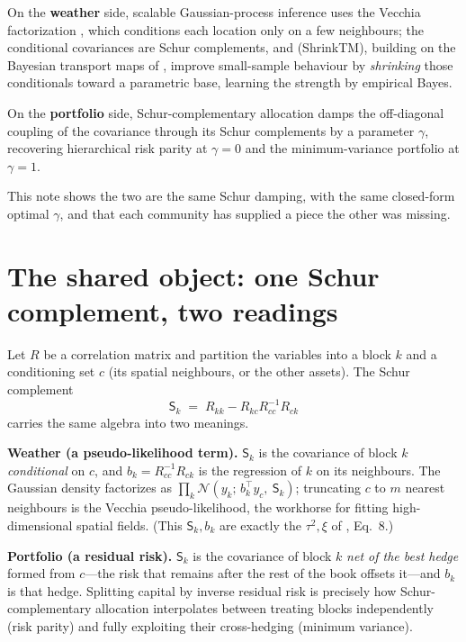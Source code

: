 \documentclass[11pt]{article}
\newcommand{\Nb}{\mathcal N}
\newcommand{\Sc}{\mathsf S}
\begin{document}
On the \textbf{weather} side, scalable Gaussian-process inference uses the Vecchia factorization
\citep{vecchia1988,katzfuss2021}, which conditions each location only on a few neighbours; the
conditional covariances are Schur complements, and \citet{chakraborty2025} (ShrinkTM), building on the
Bayesian transport maps of \citet{katzfuss2024}, improve small-sample behaviour by \emph{shrinking}
those conditionals toward a parametric base, learning the strength by empirical Bayes.

On the \textbf{portfolio} side, Schur-complementary allocation \citep{cotton2024} damps the
off-diagonal coupling of the covariance through its Schur complements by a parameter $\gamma$,
recovering hierarchical risk parity \citep{lopezdeprado2016} at $\gamma=0$ and the minimum-variance
portfolio at $\gamma=1$.

This note shows the two are the same Schur damping, with the same closed-form optimal $\gamma$, and
that each community has supplied a piece the other was missing.

\section{The shared object: one Schur complement, two readings}
Let $R$ be a correlation matrix and partition the variables into a block $k$ and a conditioning set
$c$ (its spatial neighbours, or the other assets). The Schur complement
\begin{equation}
  \Sc_k \;=\; R_{kk}-R_{kc}R_{cc}^{-1}R_{ck}
\end{equation}
carries the same algebra into two meanings.

\smallskip
\noindent\textbf{Weather (a pseudo-likelihood term).} $\Sc_k$ is the covariance of block $k$
\emph{conditional} on $c$, and $b_k=R_{cc}^{-1}R_{ck}$ is the regression of $k$ on its neighbours. The
Gaussian density factorizes as $\prod_k\Nb(y_k;\,b_k^\top y_c,\ \Sc_k)$; truncating $c$ to $m$ nearest
neighbours is the Vecchia pseudo-likelihood, the workhorse for fitting high-dimensional spatial fields.
(This $\Sc_k,b_k$ are exactly the $\tau^2,\xi$ of \citealp{chakraborty2025}, Eq.~8.)

\smallskip
\noindent\textbf{Portfolio (a residual risk).} $\Sc_k$ is the covariance of block $k$ \emph{net of the
best hedge} formed from $c$---the risk that remains after the rest of the book offsets it---and $b_k$
is that hedge. Splitting capital by inverse residual risk is precisely how Schur-complementary
allocation \citep{cotton2024} interpolates between treating blocks independently (risk parity) and
fully exploiting their cross-hedging (minimum variance).
\end{document}
